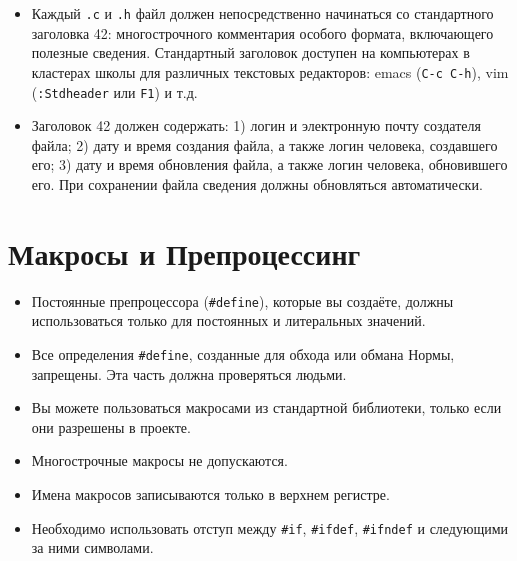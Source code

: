 \documentclass{42-ru}
\begin{document}
        \begin{itemize}

        \item Каждый \texttt{.c}  и \texttt{.h}  файл должен непосредственно начинаться со стандартного заголовка 42:
            многострочного комментария особого формата, включающего полезные сведения.
            Стандартный заголовок доступен на компьютерах в кластерах школы для различных
            текстовых редакторов: emacs (\texttt{C-c C-h}), vim (\texttt{:Stdheader} или \texttt{F1}) и т.д.

        \item Заголовок 42 должен содержать: 
            1) логин и электронную почту создателя файла;
            2) дату и время создания файла, а также логин человека, создавшего его;
            3) дату и время обновления файла, а также логин человека, обновившего его.
            При сохранении файла сведения должны обновляться автоматически.

        \end{itemize}

    \newpage


    \section{Макросы и Препроцессинг}

        \begin{itemize}

            \item Постоянные препроцессора (\texttt{#define}), которые вы создаёте, должны использоваться только для постоянных и литеральных значений.

            \item Все определения \texttt{#define}, созданные для обхода или обмана Нормы, запрещены. Эта часть должна проверяться людьми.

            \item Вы можете пользоваться макросами из стандартной библиотеки, только если они разрешены в проекте.

            \item Многострочные макросы не допускаются.

            \item Имена макросов записываются только в верхнем регистре.

            \item Необходимо использовать отступ между \texttt{\#if}, \texttt{\#ifdef}, \texttt{\#ifndef} и следующими за ними символами.

        \end{itemize}
\end{document}
